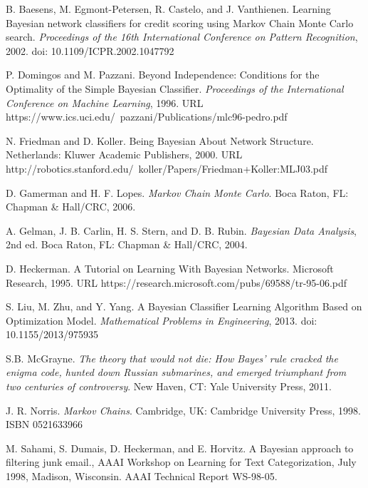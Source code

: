\documentclass[12pt,twoside]{reedthesis}
\begin{document}
  \backmatter %

\newpage
\begin{thebibliography}{1}

 B. Baesens, M. Egmont-Petersen, R. Castelo, and J. Vanthienen. Learning Bayesian network classifiers for credit scoring using Markov Chain Monte Carlo search. {\em Proceedings of the 16th International Conference on Pattern Recognition}, 2002. doi: 10.1109/ICPR.2002.1047792

 P. Domingos and M. Pazzani. Beyond Independence: Conditions for the Optimality of the Simple Bayesian Classifier. {\em Proceedings of the International Conference on Machine Learning}, 1996. URL https://www.ics.uci.edu/~pazzani/Publications/mlc96-pedro.pdf

 N. Friedman and D. Koller. Being Bayesian About Network Structure. Netherlands: Kluwer Academic Publishers, 2000. URL http://robotics.stanford.edu/~koller/Papers/Friedman+Koller:MLJ03.pdf

 D. Gamerman and H. F. Lopes. {\em Markov Chain Monte Carlo}. Boca Raton, FL: Chapman \& Hall/CRC, 2006.

 A. Gelman, J. B. Carlin, H. S. Stern, and D. B. Rubin. {\em Bayesian Data Analysis}, 2nd ed. Boca Raton, FL: Chapman \& Hall/CRC, 2004.

 D. Heckerman. A Tutorial on Learning With Bayesian Networks. Microsoft Research, 1995. URL https://research.microsoft.com/pubs/69588/tr-95-06.pdf

 S. Liu, M. Zhu, and Y. Yang. A Bayesian Classifier Learning Algorithm Based on Optimization Model. {\em Mathematical Problems in Engineering}, 2013. doi: 10.1155/2013/975935 %

 S.B. McGrayne. {\em The theory that would not die: How Bayes' rule cracked the enigma code, hunted down Russian submarines, and emerged triumphant from two centuries of controversy}. New Haven, CT: Yale University Press, 2011.

 J. R. Norris. {\em Markov Chains}. Cambridge, UK: Cambridge University Press, 1998. ISBN 0521633966

 M. Sahami, S. Dumais, D. Heckerman, and E. Horvitz. A Bayesian approach to filtering junk email., AAAI Workshop on Learning for Text Categorization, July 1998, Madison, Wisconsin. AAAI Technical Report WS-98-05.

\end{thebibliography}
\end{document}
